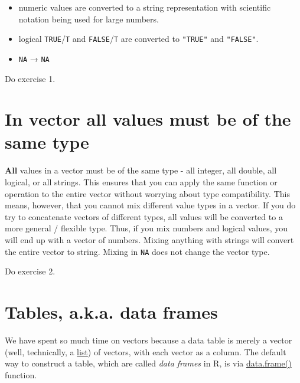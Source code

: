 \documentclass[
]{book}
\providecommand{\tightlist}{%
  \setlength{\itemsep}{0pt}\setlength{\parskip}{0pt}}
\begin{document}
\begin{itemize}
  \begin{itemize}
  \tightlist
  \item
    numeric values are converted to a string representation with scientific notation being used for large numbers.
  \item
    logical \texttt{TRUE}/\texttt{T} and \texttt{FALSE}/\texttt{T} are converted to \texttt{"TRUE"} and \texttt{"FALSE"}.
  \item
    \texttt{NA} → \texttt{NA}
  \end{itemize}
\end{itemize}

Do exercise 1.

\hypertarget{in-vector-all-values-must-be-of-the-same-type}{%
\section{In vector all values must be of the same type}\label{in-vector-all-values-must-be-of-the-same-type}}

\textbf{All} values in a vector must be of the same type - all integer, all double, all logical, or all strings. This ensures that you can apply the same function or operation to the entire vector without worrying about type compatibility. This means, however, that you cannot mix different value types in a vector. If you do try to concatenate vectors of different types, all values will be converted to a more general / flexible type. Thus, if you mix numbers and logical values, you will end up with a vector of numbers. Mixing anything with strings will convert the entire vector to string. Mixing in \texttt{NA} does not change the vector type.

Do exercise 2.

\hypertarget{data.frame}{%
\section{Tables, a.k.a. data frames}\label{data.frame}}

We have spent so much time on vectors because a data table is merely a vector (well, technically, a \href{https://www.rdocumentation.org/packages/base/versions/3.6.2/topics/list}{list}) of vectors, with each vector as a column. The default way to construct a table, which are called \emph{data frames} in R, is via \href{https://www.rdocumentation.org/packages/base/versions/3.6.2/topics/data.frame}{data.frame()} function.
\end{document}
